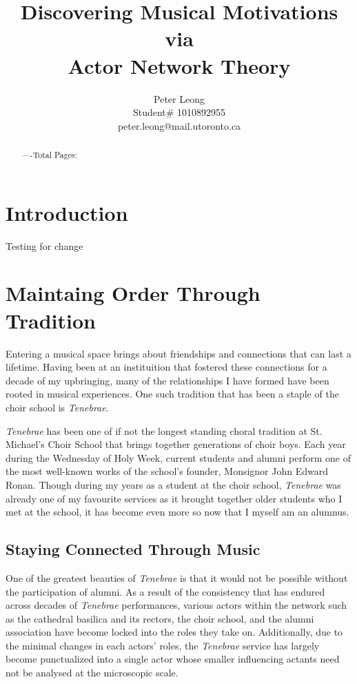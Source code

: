 \documentclass{article} %
\title{Discovering Musical Motivations via \\
Actor Network Theory}
\author{Peter Leong \\
Student\# 1010892955 \\
peter.leong@mail.utoronto.ca \\
\AND
}
\begin{document}
\maketitle

\vspace{-6ex}

\begin{abstract}
----Total Pages: \pageref{last_page}
\end{abstract}

\vspace{2ex}

\begin{multicols}{2}

\section{Introduction}

Testing for change

\section{Maintaing Order Through Tradition}

Entering a musical space brings about friendships and connections that can last a lifetime.
Having been at an instituition that fostered these connections for a decade of my upbringing, many of the relationships I have formed have been rooted in musical experiences.
One such tradition that has been a staple of the choir school is \textit{Tenebrae}.

\textit{Tenebrae} has been one of if not the longest standing choral tradition at St. Michael's Choir School that brings together generations of choir boys.
Each year during the Wednesday of Holy Week, current students and alumni perform one of the most well-known works of the school's founder, Monsignor John Edward Ronan.
Though during my years as a student at the choir school, \textit{Tenebrae} was already one of my favourite services as it brought together older students who I met at the school, it has become even more so now that I myself am an alumnus.

\subsection{Staying Connected Through Music}

One of the greatest beauties of \textit{Tenebrae} is that it would not be possible without the participation of alumni.
As a result of the consistency that has endured across decades of \textit{Tenebrae} performances, various actors within the network such as the cathedral basilica and its rectors, the choir school, and the alumni association have become locked into the roles they take on.
Additionally, due to the minimal changes in each actors' roles, the \textit{Tenebrae} service has largely become punctualized into a single actor whose smaller influencing actants need not be analysed at the microscopic scale.


\end{multicols}
\end{document}
